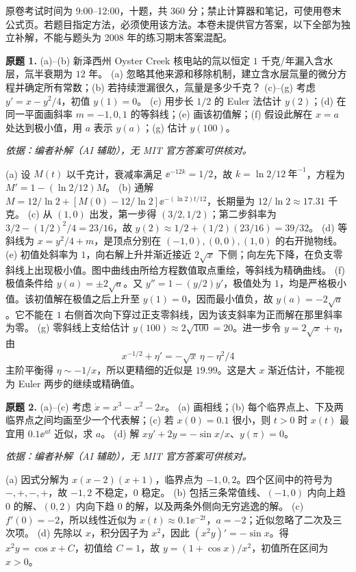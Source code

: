 原卷考试时间为 9:00--12:00，十题，共 360 分；禁止计算器和笔记，可使用卷末公式页。若题目指定方法，必须使用该方法。本卷未提供官方答案，以下全部为独立补解，不能与题头为 2008 年的练习期末答案混配。
\begin{exercise}\label{cw:final-1}\textbf{原题 1.}
(a)--(b) 新泽西州 Oyster Creek 核电站的氚以恒定 $1$ 千克/年漏入含水层，氚半衰期为 $12$ 年。
(a) 忽略其他来源和移除机制，建立含水层氚量的微分方程并确定所有常数；(b) 若持续泄漏很久，氚量是多少千克？
(c)--(g) 考虑 $y'=x-y^2/4$，初值 $y(1)=0$。
(c) 用步长 $1/2$ 的 Euler 法估计 $y(2)$；(d) 在同一平面画斜率 $m=-1,0,1$ 的等斜线；(e) 画该初值解；(f) 假设此解在 $x=a$ 处达到极小值，用 $a$ 表示 $y(a)$；(g) 估计 $y(100)$。
\end{exercise}
\begin{solution}
\textit{依据：编者补解（AI 辅助），无 MIT 官方答案可供核对。}\par
(a) 设 $M(t)$ 以千克计，衰减率满足 $\ee^{-12k}=1/2$，故 $k=\ln2/12\ \text{年}^{-1}$，方程为 $M'=1-(\ln2/12)M$。
(b) 通解 $M=12/\ln2+[M(0)-12/\ln2]\ee^{-(\ln2)t/12}$，长期量为 $12/\ln2\approx17.31$ 千克。
(c) 从 $(1,0)$ 出发，第一步得 $(3/2,1/2)$；第二步斜率为 $3/2-(1/2)^2/4=23/16$，故 $y(2)\approx1/2+(1/2)(23/16)=39/32$。
(d) 等斜线为 $x=y^2/4+m$，是顶点分别在 $(-1,0),(0,0),(1,0)$ 的右开抛物线。
(e) 初值处斜率为 $1$，向右解上升并渐近接近 $2\sqrt x$ 下侧；向左先下降，在负支零斜线上出现极小值。图中曲线由所给方程数值取点重绘，等斜线为精确曲线。
\ODEExamFinalField
(f) 极值条件给 $y(a)=\pm2\sqrt a$。又 $y''=1-(y/2)y'$，极值处为 $1$，均是严格极小值。该初值解在极值之后上升至 $y(1)=0$，因而最小值负，故 $y(a)=-2\sqrt a$。它不能在 $1$ 右侧首次向下穿过正支零斜线，因为该支斜率为正而解在那里斜率为零。
(g) 零斜线上支给估计 $y(100)\approx2\sqrt{100}=20$。进一步令 $y=2\sqrt x+\eta$，由
\[x^{-1/2}+\eta'=-\sqrt x\,\eta-\eta^2/4\]
主阶平衡得 $\eta\sim-1/x$，所以更精细的近似是 $19.99$。这是大 $x$ 渐近估计，不能视为 Euler 两步的继续或精确值。
\end{solution}
\begin{exercise}\label{cw:final-2}\textbf{原题 2.}
(a)--(c) 考虑 $\dot x=x^3-x^2-2x$。
(a) 画相线；(b) 每个临界点上、下及两临界点之间均画至少一个代表解；(c) 若 $x(0)=0.1$ 很小，则 $t>0$ 时 $x(t)$ 最宜用 $0.1\ee^{at}$ 近似，求 $a$。
(d) 解 $x y'+2y=-\sin x/x$、$y(\pi)=0$。
\end{exercise}
\begin{solution}
\textit{依据：编者补解（AI 辅助），无 MIT 官方答案可供核对。}\par
(a) 因式分解为 $x(x-2)(x+1)$，临界点为 $-1,0,2$。四个区间中的符号为 $-,+,-,+$，故 $-1,2$ 不稳定，$0$ 稳定。
(b) 包括三条常值线、$(-1,0)$ 内向上趋 $0$ 的解、$(0,2)$ 内向下趋 $0$ 的解，以及两条外侧向无穷逃逸的解。\ODEExamFinalPhase
(c) $f'(0)=-2$，所以线性近似为 $x(t)\approx0.1\ee^{-2t}$，$a=-2$；近似忽略了二次及三次项。
(d) 先除以 $x$，积分因子为 $x^2$，因此 $(x^2y)'=-\sin x$。得 $x^2y=\cos x+C$，初值给 $C=1$，故 $y=(1+\cos x)/x^2$，初值所在区间为 $x>0$。
\end{solution}
